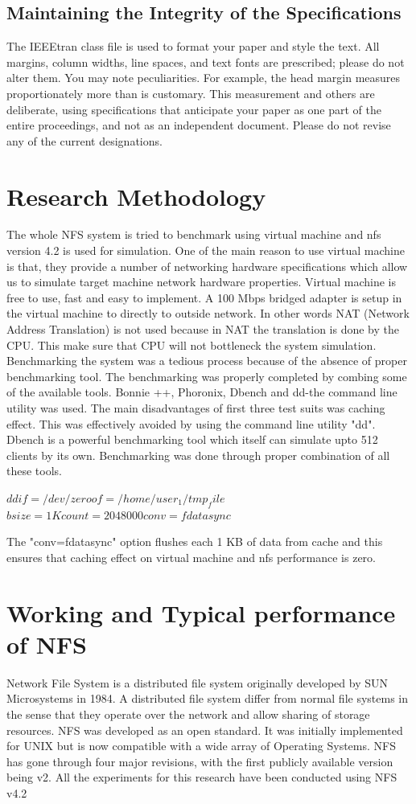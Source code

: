 \documentclass[conference]{IEEEtran}
\begin{document}
\subsection{Maintaining the Integrity of the Specifications}

The IEEEtran class file is used to format your paper and style the text. All margins, 
column widths, line spaces, and text fonts are prescribed; please do not 
alter them. You may note peculiarities. For example, the head margin
measures proportionately more than is customary. This measurement 
and others are deliberate, using specifications that anticipate your paper 
as one part of the entire proceedings, and not as an independent document. 
Please do not revise any of the current designations.

\section{Research Methodology}
The whole NFS system is tried to benchmark using virtual machine and nfs version 4.2 is used for simulation. 
One of the main reason to use virtual machine is that, they provide a number of networking hardware specifications 
which allow us to simulate target machine network hardware properties. Virtual machine is free to use, fast and easy 
to implement. A 100 Mbps bridged adapter is setup in the virtual machine to directly to outside network. In other 
words NAT (Network Address Translation) is not used because in NAT the translation is done by the CPU. This 
make sure that CPU will not bottleneck the system simulation. Benchmarking the system was a tedious process 
because of the absence of proper benchmarking tool. The benchmarking was properly completed by combing some 
of the available tools. Bonnie ++, Phoronix, Dbench and dd-the command line utility was used. The main 
disadvantages of first three test suits was caching effect. This was effectively avoided by using the command line 
utility "dd". Dbench is a powerful benchmarking tool which itself can simulate upto 512 clients by its own.
Benchmarking was done through proper combination of all these tools.

$ dd if=/dev/zero of=/home/user_1/tmp_file $
$ bsize=1K count=2048000 conv=fdatasync $
 
 The "conv=fdatasync" option flushes each 1 KB of data from cache and this ensures that caching effect on virtual 
 machine and nfs performance is zero.
\section{Working and Typical performance of NFS}
Network File System is a distributed file system originally developed by
SUN Microsystems in 1984. A distributed file system differ from normal file
systems in the sense that they operate over the network and allow sharing of
storage resources. NFS was developed as an open standard. It was initially
implemented for UNIX but is now compatible with a wide array of Operating
Systems. NFS has gone through four major revisions, with the first publicly
available version being v2. All the experiments for this research have been
conducted using NFS v4.2
\end{document}

